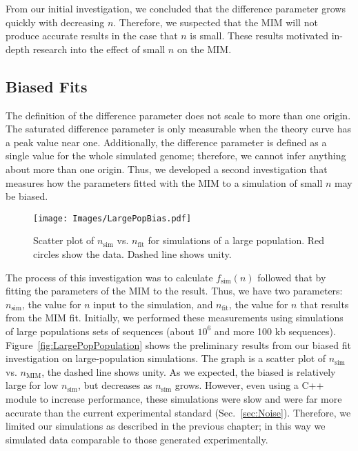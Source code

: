		From our initial investigation, we concluded that the difference parameter grows quickly with decreasing $n$.
		Therefore, we suspected that the MIM will not produce accurate results in the case that $n$ is small.
		These results motivated in-depth research into the effect of small $n$ on the MIM.
		
		
		\subsection{Biased Fits}
		\label{subsec:BiasedFits}
		
		The definition of the difference parameter does not scale to more than one origin.
		The saturated difference parameter is only measurable when the theory curve has a peak value near one.
		Additionally, the difference parameter is defined as a single value for the whole simulated genome; therefore, we cannot infer anything about more than one origin.
		Thus, we developed a second investigation that measures how the parameters fitted with the MIM to a simulation of small $n$ may be biased.
		
		\begin{figure}[tbh]
			\begin{center}
				\texttt{[image: Images/LargePopBias.pdf]}
			\end{center}
			\caption[Bias in MIM fit on Large-Population Simulations]{\label{fig:LargePopulation} Scatter plot of $n_\text{sim}$ vs. $n_\text{fit}$ for simulations of a large population.
			Red circles show the data. Dashed line shows unity.
			}
		\end{figure}
		
		The process of this investigation was to calculate $f_\text{sim}(n)$ followed that by fitting the parameters of the MIM to the result.
		Thus, we have two parameters: $n_\text{sim}$, the value for $n$ input to the simulation, and $n_\text{fit}$, the value for $n$ that results from the MIM fit.
		Initially, we performed these measurements using simulations of large populations sets of sequences (about $10^6$ and more 100 kb sequences).
		Figure~\ref{fig:LargePopPopulation} shows the preliminary results from our biased fit investigation on large-population simulations.
		The graph is a scatter plot of $n_\text{sim}$ vs. $n_\text{MIM}$, the dashed line shows unity.
		As we expected, the biased is relatively large for low $n_\text{sim}$, but decreases as $n_\text{sim}$ grows.
		However, even using a C++ module to increase performance, these simulations were slow and were far more accurate than the current experimental standard (Sec.~\ref{sec:Noise}).
		Therefore, we limited our simulations as described in the previous chapter; in this way we simulated data comparable to those generated experimentally.
		
